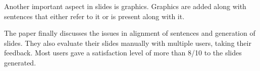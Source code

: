 \documentclass[conference]{IEEEtran}
\begin{document}
Another important aspect in slides is graphics. Graphics are added along with sentences 
that either refer to it or is present along with it.

The paper finally discusses the issues in alignment of sentences and generation of slides.
They also evaluate their slides manually with multiple users, taking their feedback.
Most users gave a satisfaction level of more than 8/10 to the slides generated.

{\small


}
\end{document}
